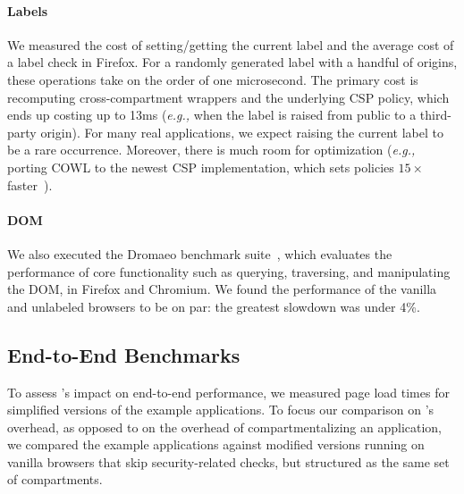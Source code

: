 \paragraph{Labels} We measured the cost of setting/getting the current
label and the average cost of a label check in Firefox.
%
For a randomly generated label with a handful of origins, these
operations take on the order of one microsecond.
%
The primary cost is recomputing cross-compartment wrappers and
the underlying CSP policy, which ends up costing up to 13ms (\emph{e.g.,} when
the label is raised from public to a third-party origin).
%
For many real applications, we expect raising the current label
to be a rare occurrence.
%
Moreover, there is much room for optimization (\emph{e.g.,}
porting COWL to the newest CSP implementation, which sets
policies $15\times$ faster~\cite{faster-csp}).
 
\paragraph{DOM} We also executed the Dromaeo benchmark suite~\cite{dromaeo},
which evaluates the performance of core functionality such as
querying, traversing, and manipulating the DOM, in Firefox and
Chromium. We found the performance of the vanilla and unlabeled
browsers to be on par: the greatest slowdown was under 4\%.

\subsection{End-to-End Benchmarks}
\label{sec:eval:macro}

To assess \sys{}'s impact on end-to-end performance, we measured
page load times for simplified versions of the example applications.
%
To focus our comparison on \sys{}'s overhead, as opposed to on the
overhead of compartmentalizing an application, we compared the example
applications against modified versions running on vanilla browsers
that skip security-related checks, but structured as the same set of
compartments.
%

